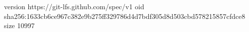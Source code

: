 version https://git-lfs.github.com/spec/v1
oid sha256:1633cb6ce967c382e9b275ff329786d4d7bdf305d8d503cbd578215857cfdce8
size 10997
